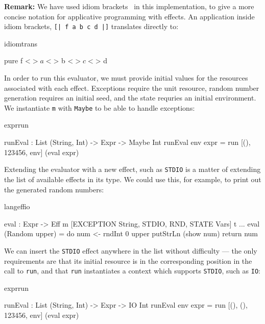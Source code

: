 \noindent
\textbf{Remark:}
We have used idiom brackets~\cite{McBride2007} in this implementation, to
give a more concise notation for applicative programming with effects.
An application inside idiom brackets, \texttt{[| f a b c d |]} translates
directly to:

\begin{SaveVerbatim}{idiomtrans}

pure f <$> a <$> b <$> c <$> d

\end{SaveVerbatim}

\noindent
In order to run this evaluator, we must provide initial values for the resources
associated with each effect. Exceptions require the unit resource, random
number generation requires an initial seed, and the state requries an initial
environment. We instantiate \texttt{m} with \texttt{Maybe} to be able
to handle exceptions:

\begin{SaveVerbatim}{exprrun}

runEval : List (String, Int) -> Expr -> Maybe Int
runEval env expr = run [(), 123456, env] (eval expr)

\end{SaveVerbatim}

\noindent
Extending the evaluator with a new effect, such as \texttt{STDIO} is a matter
of extending the list of available effects in its type.  We could use this, for
example, to print out the generated random numbers:

\begin{SaveVerbatim}{langeffio}

eval : Expr -> 
       Eff m [EXCEPTION String, STDIO, 
              RND, STATE Vars] t
...
eval (Random upper) = do num <- rndInt 0 upper
                         putStrLn (show num)
                         return num

\end{SaveVerbatim}

\noindent
We can insert the \texttt{STDIO} effect anywhere in the list without difficulty
--- the only requirements are that its initial resource is in the corresponding
position in the call to \texttt{run}, and that \texttt{run} instantiates
a context which supports \texttt{STDIO}, such as \texttt{IO}:

\begin{SaveVerbatim}{exprrun}

runEval : List (String, Int) -> Expr -> IO Int
runEval env expr 
    = run [(), (), 123456, env] (eval expr)

\end{SaveVerbatim}
